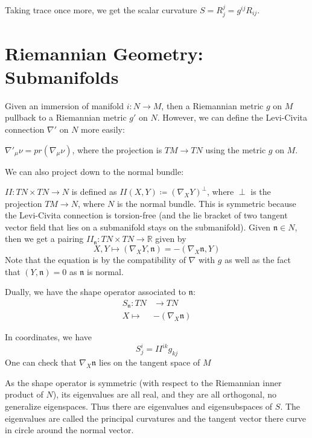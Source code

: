 \documentclass[main.tex]{subfiles}
\begin{document}
Taking trace once more, we get the scalar curvature
$S = R^j _j = g^{ij} R_{ij}$.

\section{Riemannian Geometry: Submanifolds}

Given an immersion of manifold $i: N \rightarrow M$, then a Riemannian metric $g$ on $M$ pullback to a Riemannian metric $g'$ on $N$. However, we can define the Levi-Civita connection
$\nabla'$ on $N$ more easily:
\begin{lemma}
$\nabla'_{\mu} \nu = pr (\nabla_{\mu} \nu)$, where the projection is $TM \rightarrow TN$ using the metric $g$ on $M$. 
\end{lemma}

We can also project down to the normal bundle:
\begin{definition}
$II: TN \times TN \rightarrow N$ is defined as $II(X, Y) \coloneqq (\nabla_{X} Y)^\perp$, where $\perp$ is the projection $TM \rightarrow N$, where $N$ is the normal bundle. This is symmetric because the Levi-Civita connection is torsion-free (and the lie bracket of two tangent vector field that lies on a submanifold stays on the submanifold).
Given $\mathfrak{n} \in N$, then we get a pairing $II_\mathfrak{n}: TN \times TN \rightarrow \mathbb{R}$ given by 
$$
X, Y \mapsto (\nabla_{X} Y, \mathfrak{n}) = - (\nabla_{X} \mathfrak{n}, Y)
$$
Note that the equation is by the compatibility of $\nabla$ with $g$ as well as the fact that $(Y, \mathfrak{n}) = 0$ as $\mathfrak{n}$ is normal.

Dually, we have the shape operator associated to $\mathfrak{n}$: 
\begin{align*}
S_{\mathfrak{n}}: TN &\rightarrow TN \\ 
X  \mapsto & - (\nabla_{X} \mathfrak{n}) 
\end{align*}
\end{definition}

In coordinates, we have 
$$
S^i _j =  II^{ik} g_{kj}
$$
One can check that $\nabla_{X} \mathfrak{n}$ lies on the tangent space of $M$

As the shape operator is symmetric (with respect to the Riemannian inner product of $N$), its eigenvalues are all real, and they are all orthogonal, no generalize eigenspaces. Thus there are eigenvalues and eigensubspaces of $S$. The eigenvalues are called the principal curvatures and the tangent vector there curve in circle around the normal vector.
\end{document}
